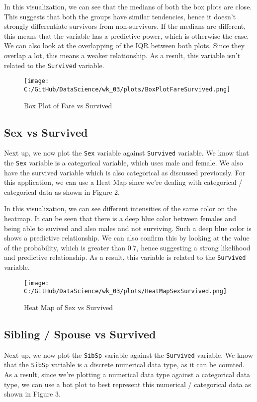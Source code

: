 \documentclass[a4paper, twocolumn]{article}
\begin{document}
In this visualization, we can see that the medians of both the box plots are close. This suggests that both the groups
have similar tendencies, hence it doesn't strongly differentiate survivors from non-survivors. If the medians are
different, this means that the variable has a predictive power, which is otherwise the case. We can also look at the
overlapping of the IQR between both plots. Since they overlap a lot, this means a weaker relationship. As a result,
this variable isn't related to the \texttt{Survived} variable.

\begin{figure}[h!] 
    \centering
    \noindent
    \texttt{[image: C:/GitHub/DataScience/wk\_03/plots/BoxPlotFareSurvived.png]}  
    \caption{Box Plot of Fare vs Survived} 
\end{figure}

\subsection{Sex vs Survived}
Next up, we now plot the \texttt{Sex} variable against \texttt{Survived} variable. We know that the \texttt{Sex}
variable is a categorical variable, which uses male and female. We also have the survived variable which is also
categorical as discussed previously. For this application, we can use a Heat Map since we're dealing with categorical
/ categorical data as shown in Figure 2.

In this visualization, we can see different intensities of the same color on the heatmap. It can be seen that there
is a deep blue color between females and being able to suvived and also males and not surviving. Such a deep blue
color is shows a predictive relationship. We can also confirm this by looking at the value of the probability, which is greater than 0.7, hence suggesting a 
strong likelihood and predictive relationship. As a result, this variable is related to the \texttt{Survived} variable.

\begin{figure}[h!] 
    \centering
    \noindent
    \texttt{[image: C:/GitHub/DataScience/wk\_03/plots/HeatMapSexSurvived.png]}  
    \caption{Heat Map of Sex vs Survived} 
\end{figure}

\subsection{Sibling / Spouse vs Survived}
Next up, we now plot the \texttt{SibSp} variable against the \texttt{Survived} variable. We know that the
\texttt{SibSp} variable is a discrete numerical data type, as it can be counted. As a result, since we're plotting
a numerical data type against a categorical data type, we can use a bot plot to best represent this numerical 
/ categorical data as shown in Figure 3.
\end{document}
